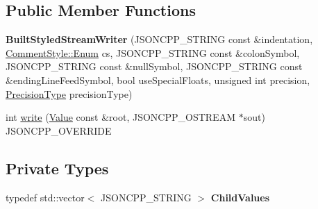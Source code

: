 \subsection*{Public Member Functions}
\begin{DoxyCompactItemize}
\item 
\mbox{\label{structJson_1_1BuiltStyledStreamWriter_a69c46ddeca7a524734ae2be0866a4d98}} 
{\bfseries Built\+Styled\+Stream\+Writer} (J\+S\+O\+N\+C\+P\+P\+\_\+\+S\+T\+R\+I\+NG const \&indentation, \hyperlink{structJson_1_1CommentStyle_a51fc08f3518fd81eba12f340d19a3d0c}{Comment\+Style\+::\+Enum} cs, J\+S\+O\+N\+C\+P\+P\+\_\+\+S\+T\+R\+I\+NG const \&colon\+Symbol, J\+S\+O\+N\+C\+P\+P\+\_\+\+S\+T\+R\+I\+NG const \&null\+Symbol, J\+S\+O\+N\+C\+P\+P\+\_\+\+S\+T\+R\+I\+NG const \&ending\+Line\+Feed\+Symbol, bool use\+Special\+Floats, unsigned int precision, \hyperlink{namespaceJson_af6e1447a3c43e3a62e11050dd0a11ce8}{Precision\+Type} precision\+Type)
\item 
int \hyperlink{structJson_1_1BuiltStyledStreamWriter_a823cdb1afabb6b0d5f39bcd5a6a6f747}{write} (\hyperlink{classJson_1_1Value}{Value} const \&root, J\+S\+O\+N\+C\+P\+P\+\_\+\+O\+S\+T\+R\+E\+AM $\ast$sout) J\+S\+O\+N\+C\+P\+P\+\_\+\+O\+V\+E\+R\+R\+I\+DE
\end{DoxyCompactItemize}
\subsection*{Private Types}
\begin{DoxyCompactItemize}
\item 
\mbox{\label{structJson_1_1BuiltStyledStreamWriter_a63196b38400e5ce452f65ce856d47b6f}} 
typedef std\+::vector$<$ J\+S\+O\+N\+C\+P\+P\+\_\+\+S\+T\+R\+I\+NG $>$ {\bfseries Child\+Values}
\end{DoxyCompactItemize}
